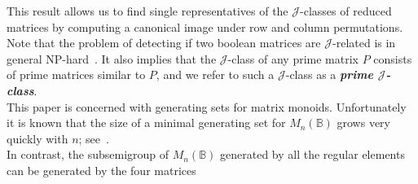 \documentclass[11pt]{article}
\newcommand{\defn}[1]{\textbf{\textit{#1}}}
\numberwithin{equation}{section}
\newcommand{\B}{\mathbb{B}}
\newcommand{\Bn}{M_n(\B)}
\newcommand{\J}{\mathscr{J}}
\begin{document}
This result allows us to find single representatives of the $\J$-classes of
reduced matrices by computing a canonical image under row and column
permutations. Note that the problem of detecting if two boolean matrices are
$\J$-related is in general NP-hard~\cite{Fenner2018aa}. It also implies that the
$\J$-class of any prime matrix $P$ consists of prime matrices similar to $P$,
and we refer to such a $\J$-class as a \defn{prime $\J$-class}. \\

This paper is concerned with generating sets for matrix monoids. Unfortunately
it is known that the size of a minimal generating set for $\Bn$ grows very
quickly with $n$; see~.\\

In contrast, the subsemigroup of $\Bn$ generated by all the regular elements can
be generated by the four matrices \cite{Roush1977aa}
\end{document}
